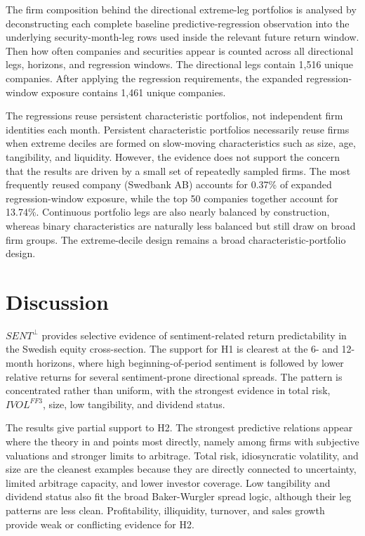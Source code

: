 \documentclass[11pt]{article}
\newcommand{\var}[1]{\ensuremath{#1}}
\begin{document}
The firm composition behind the directional extreme-leg portfolios is analysed by deconstructing each complete baseline predictive-regression observation into the underlying security-month-leg rows used inside the relevant future return window. Then how often companies and securities appear is counted across all directional legs, horizons, and regression windows. The directional legs contain 1,516 unique companies. After applying the regression requirements, the expanded regression-window exposure contains 1,461 unique companies.

The regressions reuse persistent characteristic portfolios, not independent firm identities each month. Persistent characteristic portfolios necessarily reuse firms when extreme deciles are formed on slow-moving characteristics such as size, age, tangibility, and liquidity. However, the evidence does not support the concern that the results are driven by a small set of repeatedly sampled firms. The most frequently reused company (Swedbank AB) accounts for 0.37\% of expanded regression-window exposure, while the top 50 companies together account for 13.74\%. Continuous portfolio legs are also nearly balanced by construction, whereas binary characteristics are naturally less balanced but still draw on broad firm groups. The extreme-decile design remains a broad characteristic-portfolio design.

\section{Discussion}
\var{SENT^{\perp}} provides selective evidence of sentiment-related return predictability in the Swedish equity cross-section. The support for H1 is clearest at the 6- and 12-month horizons, where high beginning-of-period sentiment is followed by lower relative returns for several sentiment-prone directional spreads. The pattern is concentrated rather than uniform, with the strongest evidence in total risk, \var{IVOL^{FF3}}, size, low tangibility, and dividend status.

The results give partial support to H2. The strongest predictive relations appear where the theory in \citet{baker2006sentiment} and \citet{baker2007} points most directly, namely among firms with subjective valuations and stronger limits to arbitrage. Total risk, idiosyncratic volatility, and size are the cleanest examples because they are directly connected to uncertainty, limited arbitrage capacity, and lower investor coverage. Low tangibility and dividend status also fit the broad Baker-Wurgler spread logic, although their leg patterns are less clean. Profitability, illiquidity, turnover, and sales growth provide weak or conflicting evidence for H2. 
\end{document}
